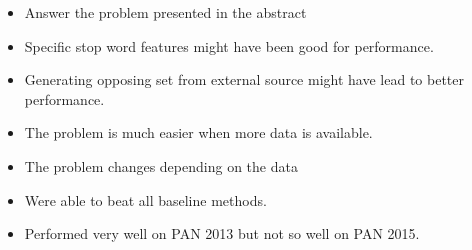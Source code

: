 \begin{itemize}
    \item Answer the problem presented in the abstract
    \item Specific stop word features might have been good for performance.
    \item Generating opposing set from external source might have lead to better
        performance.
    \item The problem is much easier when more data is available.
    \item The problem changes depending on the data
    \item Were able to beat all baseline methods.
    \item Performed very well on PAN 2013 but not so well on PAN 2015.
\end{itemize}
